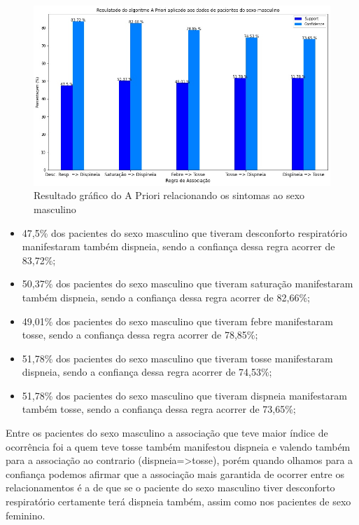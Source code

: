 \documentclass[tcc1]{uftex}
\begin{document}
    \begin{figure}[!h]
    \centering
    \includegraphics[width=13cm]{AprioriIMG_sexo_masculino.jpg}
    \caption{Resultado gráfico do A Priori relacionando os sintomas ao sexo masculino}
    \end{figure}
    
     \begin{itemize}
    \item 47,5\% dos pacientes do sexo masculino que tiveram desconforto respiratório manifestaram também dispneia, sendo a confiança dessa regra acorrer de 83,72\%;
    
    \item 50,37\% dos pacientes do sexo masculino que tiveram saturação manifestaram também dispneia, sendo a confiança dessa regra acorrer de 82,66\%;
    
    \item 49,01\% dos pacientes do sexo masculino que tiveram febre manifestaram tosse, sendo a confiança dessa regra acorrer de 78,85\%;
    
    \item 51,78\% dos pacientes do sexo masculino que tiveram tosse manifestaram dispneia, sendo a confiança dessa regra acorrer de 74,53\%;
    
    \item 51,78\% dos pacientes do sexo masculino que tiveram dispneia manifestaram também tosse, sendo a confiança dessa regra acorrer de 73,65\%;
    \end{itemize}
    
      Entre os pacientes do sexo masculino a associação que teve maior índice de ocorrência foi a quem teve tosse também manifestou dispneia e valendo também para a associação ao contrario (dispneia=>tosse), porém quando olhamos para a confiança podemos afirmar que a associação mais garantida de ocorrer entre os relacionamentos é a de que se o paciente do sexo masculino tiver desconforto respiratório certamente terá dispneia também, assim como nos pacientes de sexo feminino.
      
\end{document}
